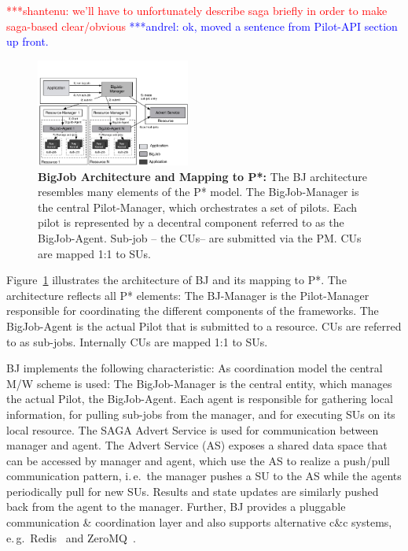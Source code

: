 \documentclass[conference,final]{IEEEtran}
\newcommand{\jhanote}[1]{ {\textcolor{red} { ***shantenu: #1 }}}
\newcommand{\alnote}[1]{ {\textcolor{blue} { ***andrel: #1 }}}
\newcommand{\alnote}[1]{}
\newcommand{\jhanote}[1]{}
\newcommand{\pilot}{Pilot\xspace}
\newcommand{\cus}{CUs\xspace}
\newcommand{\sus}{SUs\xspace}
\newcommand{\upp}{\vspace*{-0.5em}}
\begin{document}
\jhanote{we'll have to unfortunately describe saga briefly in order to
  make saga-based clear/obvious}\alnote{ok, moved a sentence from Pilot-API 
  section up front.}

\begin{figure}[t]
	\upp\upp\upp\upp
	\centering
	\includegraphics[width=0.45\textwidth]{figures/re_bigjob_interactions.pdf}
	\caption{\textbf{BigJob Architecture and Mapping to P*:} The BJ architecture 
		resembles many elements of the P* model. The BigJob-Manager is the 
		central Pilot-Manager, which 
		orchestrates a set of pilots. Each pilot is represented by a decentral 
		component referred to as the BigJob-Agent. Sub-job -- the \cus -- are 
		submitted via the PM. \cus are mapped 1:1 to \sus.}
	\label{fig:figures_re_bigjob_interactions}
	\upp\upp \upp
\end{figure}


Figure~\ref{fig:figures_re_bigjob_interactions} illustrates the
architecture of BJ and its mapping to P*. The architecture reflects all P* 
elements: The BJ-Manager is the Pilot-Manager responsible for coordinating the 
different components of the frameworks. The BigJob-Agent is the actual \pilot 
that is submitted to a resource. \cus are referred to as sub-jobs. Internally \cus are mapped 1:1 to \sus.

BJ implements the following characteristic: As coordination model the central
M/W scheme is used: The BigJob-Manager is the central entity, which manages the
actual \pilot, the BigJob-Agent. Each agent is responsible for gathering local
information, for pulling sub-jobs from the manager, and for executing SUs on its
local resource. The SAGA Advert Service is used for communication between
manager and agent. The Advert Service (AS) exposes a shared data space that can
be accessed by manager and agent, which use the AS to realize a push/pull
communication pattern, i.\,e.\ the manager pushes a SU to the AS while the
agents periodically pull for new SUs. Results and state updates are similarly
pushed back from the agent to the manager. Further, BJ provides a pluggable
communication \& coordination layer and also supports alternative c\&c systems,
e.\,g.\ Redis~\cite{redis} and ZeroMQ~\cite{zmq}.
\end{document}

